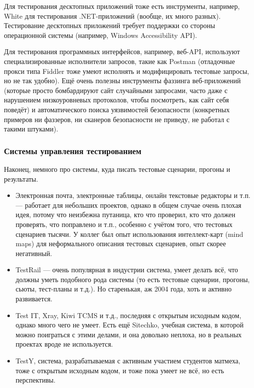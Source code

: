 \documentclass{../../text-style}
\begin{document}
Для тестирования десктопных приложений тоже есть инструменты, например, White для тестирования .NET-приложений (вообще, их много разных). Тестирование десктопных приложений требует поддержки со стороны операционной системы (например, Windows Accessibility API).

Для тестирования программных интерфейсов, например, веб-API, используют специализированные исполнители запросов, такие как Postman (отладочные прокси типа Fiddler тоже умеют исполнять и модифицировать тестовые запросы, но не так удобно). Ещё очень полезны инструменты фаззинга веб-приложений (которые просто бомбардируют сайт случайными запросами, часто даже с нарушением низкоуровневых протоколов, чтобы посмотреть, как сайт себя поведёт) и автоматического поиска уязвимостей безопасности (конкретных примеров ни фаззеров, ни сканеров безопасности не приведу, не работал с такими штуками).

\subsubsection{Системы управления тестированием}

Наконец, немного про системы, куда писать тестовые сценарии, прогоны и результаты.

\begin{itemize}
    \item Электронная почта, электронные таблицы, онлайн текстовые редакторы и т.п. --- работает для небольших проектов, однако в общем случае очень плохая идея, потому что неизбежна путаница, кто что проверил, кто что должен проверять, что поправлено и т.п., особенно с учётом того, что тестовых сценариев тысячи. У коллег был опыт использования интеллект-карт (mind maps) для неформального описания тестовых сценариев, опыт скорее негативный.
    \item TestRail --- очень популярная в индустрии система, умеет делать всё, что должны уметь подобного рода системы (то есть тестовые сценарии, прогоны, сьюты, тест-планы и т.д.). Но старенькая, аж 2004 года, хоть и активно развивается.
    \item Test IT, Xray, Kiwi TCMS и т.д., последняя с открытым исходным кодом, однако много чего не умеет. Есть ещё Sitechko, учебная система, в которой можно поиграться с этими делами, и она довольно неплоха, но в реальных проектах вроде не используется.
    \item TestY, система, разрабатываемая с активным участием студентов матмеха, тоже с открытым исходным кодом, и тоже пока умеет не всё, но есть перспективы.
\end{itemize}
\end{document}
